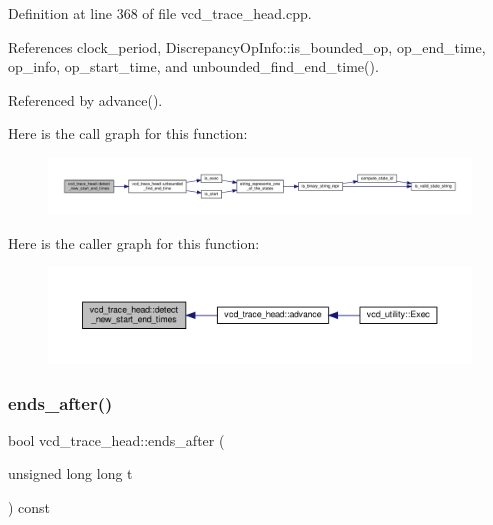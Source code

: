 Definition at line 368 of file vcd\+\_\+trace\+\_\+head.\+cpp.



References clock\+\_\+period, Discrepancy\+Op\+Info\+::is\+\_\+bounded\+\_\+op, op\+\_\+end\+\_\+time, op\+\_\+info, op\+\_\+start\+\_\+time, and unbounded\+\_\+find\+\_\+end\+\_\+time().



Referenced by advance().

Here is the call graph for this function\+:
\nopagebreak
\begin{figure}[H]
\begin{center}
\leavevmode
\includegraphics[width=350pt]{df/d30/structvcd__trace__head_ab2ccd52157df2b0a82e47dec7a3942c4_cgraph}
\end{center}
\end{figure}
Here is the caller graph for this function\+:
\nopagebreak
\begin{figure}[H]
\begin{center}
\leavevmode
\includegraphics[width=350pt]{df/d30/structvcd__trace__head_ab2ccd52157df2b0a82e47dec7a3942c4_icgraph}
\end{center}
\end{figure}
\mbox{\label{structvcd__trace__head_a08e6fa00d6e2d694a3297cd536558cb1}} 
\subsubsection{\texorpdfstring{ends\+\_\+after()}{ends\_after()}}
{\footnotesize\ttfamily bool vcd\+\_\+trace\+\_\+head\+::ends\+\_\+after (\begin{DoxyParamCaption}\item[{unsigned long long}]{t }\end{DoxyParamCaption}) const\hspace{0.3cm}{\ttfamily [inline]}}



